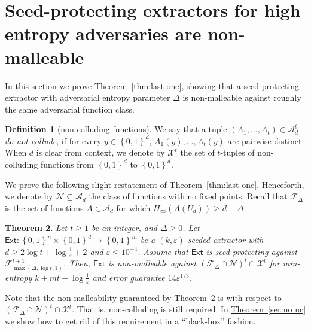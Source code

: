 \documentclass[11pt]{article}
\numberwithin{equation}{section}
\newtheorem{theorem}{Theorem}[section]
\theoremstyle{definition}
\newtheorem{definition}[theorem]{Definition}
\theoremstyle{plain}
\newcommand{\expref}[2]{\hyperref[#2]{#1~\ref{#2}}}
\newcommand{\ext}{\mathsf{Ext}}
\newcommand{\adv}{A}
\newcommand{\advfam}{\mathcal{A}}
\newcommand{\eps}{\varepsilon}
\newcommand{\nc}{\mathcal{X}}
\newcommand{\me}{{H_{\infty}}}
\newcommand{\set}[1]{\left\{{#1}\right\}}
\newcommand{\B}{\set{0,1}}
\newcommand{\advfampart}{\mathcal{F}}
\newcommand{\nofp}{\mathcal{N}}
\begin{document}
%
\section{Seed-protecting  %
extractors for high entropy adversaries are non-malleable}\label{sec:the delta proof}

In this section we prove \expref{Theorem}{thm:last one}, showing that a seed-protecting extractor with adversarial entropy parameter $\Delta$
is non-malleable against roughly the same adversarial function class.



\begin{definition}[non-colluding functions]
	We say that a tuple $(\adv_1,\ldots,\adv_t) \in \advfam_d^t$ 
	\emph{do not collude}, if for every $y \in \B^d$, $\adv_1(y),\ldots,\adv_{t}(y)$ are pairwise distinct. 
	When $d$ is clear from context, we denote by $\nc^t$ the set of $t$-tuples of non-colluding
	functions from $\B^d$ to $\B^d$. %
\end{definition}



We prove the following slight restatement of \expref{Theorem}{thm:last one}. Henceforth, we denote by
$\nofp \subseteq \advfam_d$ the class of functions with no fixed points. Recall that $\mathcal{F}_{\Delta}$ is the set of functions $A \in \advfam_d$ for which $\me(A(U_d)) \ge d-\Delta$.

\begin{theorem}\label{t: sp to nm}
Let $t \ge 1$ be an integer, and $\Delta \ge 0$.
Let $\ext\colon\B^{n}\times\B^{d}\rightarrow\B^m$ be a $(k,\eps)$-seeded extractor with $d \ge 2\log{t} + \log\frac1{\eps} + 2$ and $\eps \leq 10^{-4}$. Assume that $\ext$ is seed protecting against $\advfampart^{t+1}_{\max(\Delta, \log t,1)}$. Then, $\ext$ is non-malleable against $\left(\advfampart_{\Delta} \cap \nofp\right)^t \cap \nc^t$  for min-entropy $k+mt+\log\frac1{\eps}$ and error guarantee $14 \eps^{1/3}$.
\end{theorem}

Note that the non-malleability guaranteed by \expref{Theorem}{t: sp to nm} is with respect to $\left(\advfampart_{\Delta} \cap \nofp\right)^t \cap \nc^t$. That is, non-colluding is still required. In \expref{Theorem}{sec:no nc} we show how to get rid of this requirement in a ``black-box'' fashion.
\end{document}
